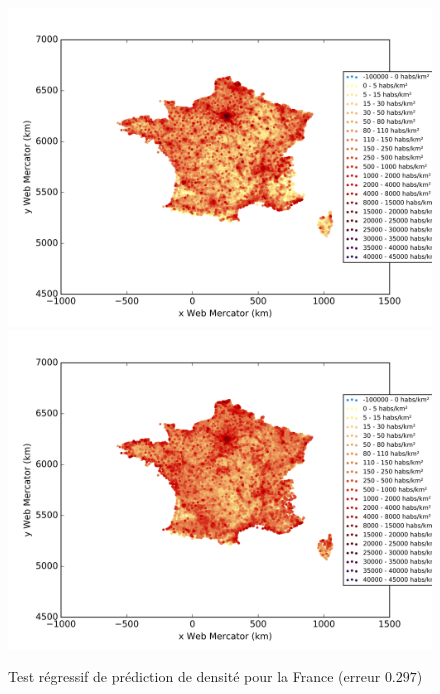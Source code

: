 \documentclass{book}
\begin{document}
\begin{figure}[H]
\begin{center}
\includegraphics[scale=0.4]{images/france_ground_truth.png}
\includegraphics[scale=0.4]{images/france_Random_Forest_Regression.png}
\end{center}
\caption{Test régressif de prédiction de densité pour la France (erreur $0.297$)}
\label{test_france}
\end{figure}
\end{document}
